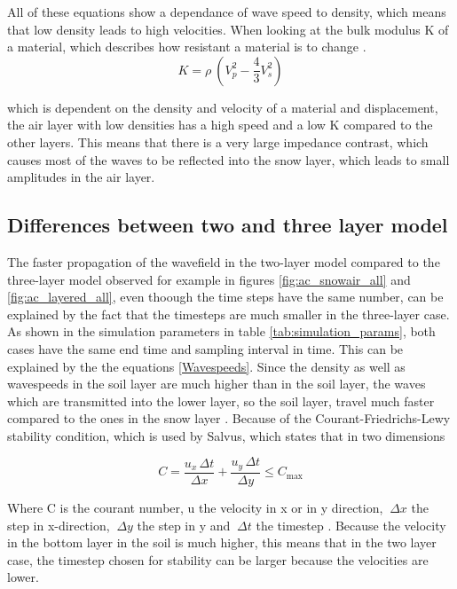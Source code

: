 \documentclass[a4paper,10pt]{article}
\begin{document}
\noindent All of these equations show a dependance of wave speed to density, which means that low density leads to high velocities. When looking at the bulk modulus K of a material, which describes how resistant a material is to change \parencite{BulkModulus2016}. 
\begin{equation}
    K = \rho \ (V_p^2 - \frac{4}{3}V_s^2)
\end{equation}

\noindent which is dependent on the density and velocity of a material and displacement, the air layer with low densities has a high speed and a low K compared to the other layers. This means that there is a very large impedance contrast, which causes most of the waves to be reflected into the snow layer, which leads to small amplitudes in the air layer. 

\subsection{Differences between two and three layer model}
\noindent The faster propagation of the wavefield in the two-layer model compared to the three-layer model observed for example in figures \ref{fig:ac_snowair_all} and \ref{fig:ac_layered_all}, even thoough the time steps have the same number, can be explained by the fact that the timesteps are much smaller in the three-layer case. As shown in the simulation parameters in table \ref{tab:simulation_params}, both cases have the same end time and sampling interval in time. This can be explained by the the equations \ref{Wavespeeds}. Since the density as well as wavespeeds in the soil layer are much higher than in the soil layer, the waves which are transmitted into the lower layer, so the soil layer, travel much faster compared to the ones in the snow layer \parencite{treitelSeismicWavePropagation1966}. Because of the Courant-Friedrichs-Lewy stability condition, which is used by Salvus, which states that in two dimensions

\begin{equation}
\label{cfl_2d}
C = \frac{u_x\,\Delta t}{\Delta x} + \frac{u_y\,\Delta t}{\Delta y}
\le C_{\max}
\end{equation}


\noindent Where C is the courant number, u the velocity in x or in y direction, $\ \Delta x$ the step in x-direction, $\ \Delta y$ the step in y and $\ \Delta t$ the timestep \parencite{courantPartialDifferenceEquations1967}.  Because the velocity in the bottom layer in the soil is much higher, this means that in the two layer case, the timestep chosen for stability can be larger because the velocities are lower. \\
\end{document}
